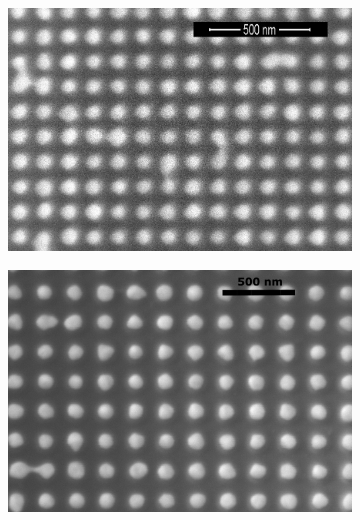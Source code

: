 \begin{figure}[htb]
    \begin{subfigure}{0.3\textwidth}
        \centering
        \includegraphics[width=\linewidth]{figures/Ch3/S6_SEM.png}
        \caption{}
        \label{fig:ch3_S6_SEM}
    \end{subfigure}
    \begin{subfigure}{0.3\textwidth}
        \centering
        \includegraphics[width=\linewidth]{figures/Ch3/S5A_SEM.png}
        \caption{}
        \label{fig:ch3_S5A_SEM}
    \end{subfigure}
    \begin{subfigure}{0.3\textwidth}
        \centering

\end{subfigure}
\end{figure}
